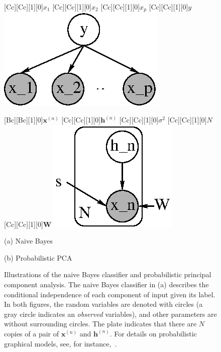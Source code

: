 \documentclass{now}
\newcommand{\vect}[1]{\mathbf{#1}}
\newcommand{\matr}[1]{\mathbf{#1}}
\newcommand{\vh}[0]{\vect{h}}
\newcommand{\vx}[0]{\vect{x}}
\newcommand{\mW}[0]{\matr{W}}
\begin{document}
\begin{figure}[t]
    \begin{minipage}{0.48\textwidth}
        \centering
        [Cc][Cc][1][0]{$x_1$}
        [Cc][Cc][1][0]{$x_2$}
        [Cc][Cc][1][0]{$x_p$}
        [Cc][Cc][1][0]{$y$}
        \includegraphics[width=0.65\columnwidth]{../figures/naiveb.eps}
    \end{minipage}
    \begin{minipage}{0.48\textwidth}
        \centering
        [Bc][Bc][1][0]{$\vx^{(n)}$}
        [Cc][Cc][1][0]{$\vh^{(n)}$}
        [Cc][Cc][1][0]{$\sigma^2$}
        [Cc][Cc][1][0]{$N$}
        [Cc][Cc][1][0]{$\mW$}
        \includegraphics[width=0.65\columnwidth]{../figures/ppca.eps}
    \end{minipage}

    \vspace{2mm}
    \begin{minipage}{0.48\textwidth}
        \centering
        \small
        (a) Naive Bayes
    \end{minipage}
    \begin{minipage}{0.48\textwidth}
        \centering
        \small
        (b) Probabilistic PCA
    \end{minipage}
    \caption{Illustrations of the naive Bayes classifier and probabilistic
        principal component analysis. The naive Bayes classifier in (a)
        describes the conditional independence of each component of input given
        its label. In both figures, the random variables are denoted with
        circles (a gray circle indicates an \textit{observed} variables), and
        other parameters are without surrounding circles. The plate indicates
        that there are $N$ copies of a pair of $\vx^{(n)}$ and $\vh^{(n)}$. For
        details on probabilistic graphical models, see, for
        instance,~\citep{Bishop2006}.}
    \label{fig:naive_bayes}
\end{figure}
\end{document}
